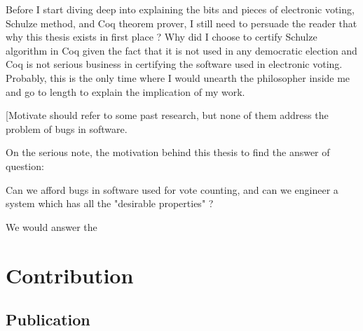   Before I start diving deep into explaining the bits and pieces 
  of electronic voting, Schulze method, and Coq theorem prover, 
  I still need to persuade the reader that why this thesis 
  exists in first place ?  Why did I choose to certify Schulze 
  algorithm in Coq given the fact that it is not used in 
  any democratic election and Coq is not serious business
  in certifying the software used in electronic voting.  
  Probably, this is the only time where I would unearth 
  the philosopher inside me and go to length to explain 
  the implication of my work. 
  
  
       
%   
  [Motivate should refer to some past research, but none of 
  them address the problem of bugs in software.  
  
  On the serious note, the motivation
  behind this thesis to find the answer of question:  
  
  Can we afford bugs in software used for vote counting, and 
  can we engineer a system which has all the "desirable properties" ?
  
  We would answer the 
  
    
      
 

\section{Contribution}

	\subsection{Publication}

